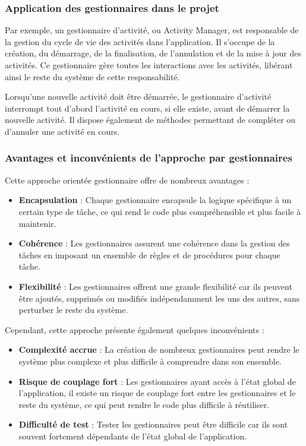 \subsubsection{Application des gestionnaires dans le projet}

Par exemple, un gestionnaire d'activité, ou \guillemotleft Activity Manager\guillemotright, est responsable de la gestion du cycle de vie des activités dans l'application. Il s'occupe de la création, du démarrage, de la finalisation, de l'annulation et de la mise à jour des activités. Ce gestionnaire gère toutes les interactions avec les activités, libérant ainsi le reste du système de cette responsabilité.

Lorsqu'une nouvelle activité doit être démarrée, le gestionnaire d'activité interrompt tout d'abord l'activité en cours, si elle existe, avant de démarrer la nouvelle activité. Il dispose également de méthodes permettant de compléter ou d'annuler une activité en cours.

\subsubsection{Avantages et inconvénients de l'approche par gestionnaires}

Cette approche orientée gestionnaire offre de nombreux avantages :

\begin{itemize}
    \item \textbf{Encapsulation} : Chaque gestionnaire encapsule la logique spécifique à un certain type de tâche, ce qui rend le code plus compréhensible et plus facile à maintenir.
    \item \textbf{Cohérence} : Les gestionnaires assurent une cohérence dans la gestion des tâches en imposant un ensemble de règles et de procédures pour chaque tâche.
    \item \textbf{Flexibilité} : Les gestionnaires offrent une grande flexibilité car ils peuvent être ajoutés, supprimés ou modifiés indépendamment les uns des autres, sans perturber le reste du système.
\end{itemize}

Cependant, cette approche présente également quelques inconvénients :

\begin{itemize}
    \item \textbf{Complexité accrue} : La création de nombreux gestionnaires peut rendre le système plus complexe et plus difficile à comprendre dans son ensemble.
    \item \textbf{Risque de couplage fort} : Les gestionnaires ayant accès à l'état global de l'application, il existe un risque de couplage fort entre les gestionnaires et le reste du système, ce qui peut rendre le code plus difficile à réutiliser.
    \item \textbf{Difficulté de test} : Tester les gestionnaires peut être difficile car ils sont souvent fortement dépendants de l'état global de l'application.
\end{itemize}

